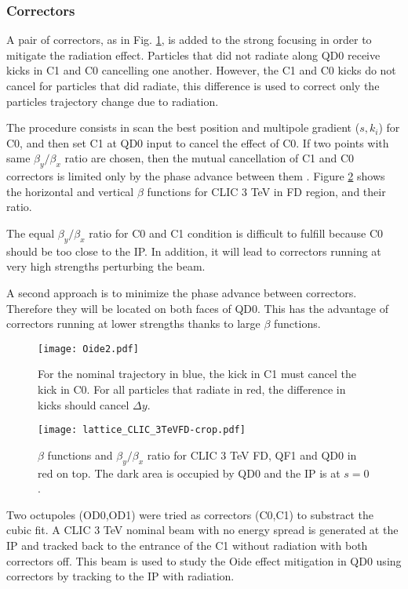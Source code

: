 \subsubsection{Correctors}
A pair of correctors, as in Fig. \ref{f:corrector}, is added to the strong focusing in order to mitigate the radiation effect. Particles that did not radiate along QD0 receive kicks in C1 and C0 cancelling one another. However, the C1 and C0 kicks do not cancel for particles that did radiate, this difference is used to correct only the particles trajectory change due to radiation.\par
The procedure consists in scan the best position and multipole gradient ($s,k_i$) for C0, and then set C1 at QD0 input to cancel the effect of C0. If two points with same $\beta_y/\beta_x$ ratio are chosen, then the mutual cancellation of C1 and C0 correctors is limited only by the phase advance between them \cite{PhysRevSTAB.8.104002}. Figure \ref{f:betaratio} shows the horizontal and vertical $\beta$ functions for CLIC 3 TeV in FD region, and their ratio.\par
The equal $\beta_y/\beta_x$ ratio for C0 and C1 condition is difficult to fulfill because C0 should be too close to the IP. In addition, it will lead to correctors running at very high strengths perturbing the beam.\par
A second approach is to minimize the phase advance between correctors. Therefore they will be located on both faces of QD0. This has the advantage of correctors running at lower strengths thanks to large $\beta$ functions.\par
\begin{figure}[!htb]
\centering
\texttt{[image: Oide2.pdf]}\caption{For the nominal trajectory in blue, the kick in C1 must cancel the kick in C0. For all particles that radiate in red, the difference in kicks should cancel $\Delta y$.}\label{f:corrector}
\end{figure}
\begin{figure}[!htb]
\centering
\texttt{[image: lattice\_CLIC\_3TeVFD-crop.pdf]}\caption{$\beta$ functions and $\beta_y/\beta_x$ ratio for CLIC 3 TeV FD, QF1 and QD0 in red on top. The dark area is occupied by QD0 and the IP is at $s=0$.}\label{f:betaratio}
\end{figure}
Two octupoles (OD0,OD1) were tried as correctors (C0,C1) to substract the cubic fit. A CLIC 3 TeV nominal beam with no energy spread is generated at the IP and tracked back to the entrance of the C1 without radiation with both correctors off. This beam is used to study the Oide effect mitigation in QD0 using correctors by tracking to the IP with radiation.\par
